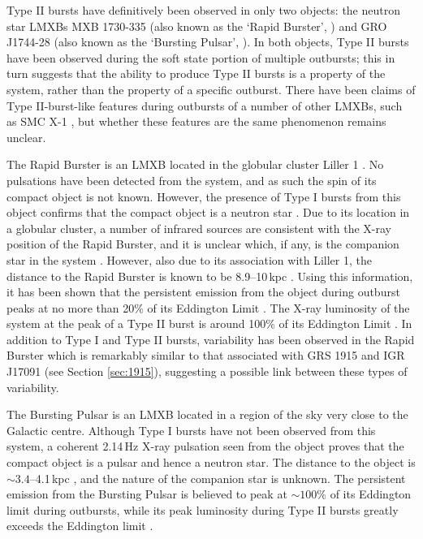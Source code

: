 \par Type II bursts have definitively been observed in only two objects: the neutron star LMXBs MXB 1730-335 (also known as the `Rapid Burster', \citealp{Lewin_TypeII}) and GRO J1744-28 (also known as the `Bursting Pulsar', \citealp{Paciesas_BPDiscovery}).  In both objects, Type II bursts have been observed during the soft state portion of multiple outbursts; this in turn suggests that the ability to produce Type II bursts is a property of the system, rather than the property of a specific outburst.  There have been claims of Type II-burst-like features during outbursts of a number of other LMXBs, such as SMC X-1 \citep{Angelini_SMC}, but whether these features are the same phenomenon remains unclear.
\par The Rapid Burster is an LMXB located in the globular cluster Liller 1 \citep{Lewin_TypeII}.  No pulsations have been detected from the system, and as such the spin of its compact object is not known.  However, the presence of Type I bursts from this object confirms that the compact object is a neutron star \citep{Hoffman_RB}.  Due to its location in a globular cluster, a number of infrared sources are consistent with the X-ray position of the Rapid Burster, and it is unclear which, if any, is the companion star in the system \citep{Homer_RBNoSec}.  However, also due to its association with Liller 1, the distance to the Rapid Burster is known to be 8.9--10\,kpc \citep{Ortolani_LillerD}.  Using this information, it has been shown that the persistent emission from the object during outburst peaks at no more than 20\% of its Eddington Limit \citep{Bagnoli_RB}.  The X-ray luminosity of the system at the peak of a Type II burst is around 100\% of its Eddington Limit \citep{Tan_RBBursts,Bagnoli_PopStudy}.  In addition to Type I and Type II bursts, variability has been observed in the Rapid Burster which is remarkably similar to that associated with GRS 1915 and IGR J17091 (see Section \ref{sec:1915}), suggesting a possible link between these types of variability.
\par The Bursting Pulsar is an LMXB located in a region of the sky very close to the Galactic centre.  Although Type I bursts have not been observed from this system, a coherent 2.14\,Hz X-ray pulsation seen from the object proves that the compact object is a pulsar \citep{Kouveliotou_BPPulse} and hence a neutron star.  The distance to the object is $\sim3.4$--4.1\,kpc \citep{Sanna_BP}, and the nature of the companion star is unknown.  The persistent emission from the Bursting Pulsar is believed to peak at $\sim100$\% of its Eddington limit during outbursts, while its peak luminosity during Type II bursts greatly exceeds the Eddington limit \citep{Sturner_BPNature}.

